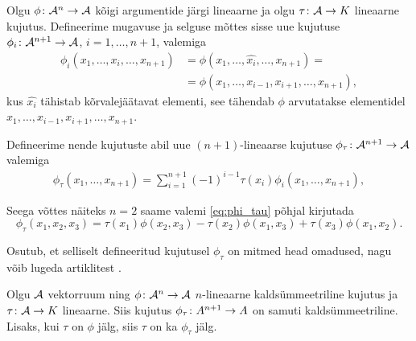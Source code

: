 Olgu $\phi \colon \mathcal{A}^n \to \mathcal{A}$ kõigi argumentide järgi lineaarne ja
olgu $\tau \colon \mathcal{A} \to K$ lineaarne kujutus. Defineerime mugavuse
ja selguse mõttes sisse uue kujutuse $\phi_i \colon \mathcal{A}^{n+1} \to \mathcal{A}$,
$i = 1, \dots, n+1$, valemiga
\begin{align*}
    \phi_i\left(x_1, \dots, x_i, \dots, x_{n+1}\right) &=
    \phi \left(x_1, \dots, \hat{x_i}, \dots, x_{n+1}\right) = \\
    &= \phi \left(x_1, \dots, x_{i-1}, x_{i+1}, \dots, x_{n+1}\right),
\end{align*}
kus $\hat{x_i}$ tähistab kõrvalejäätavat elementi, see tähendab
$\phi$ arvutatakse elementidel $x_1, \dots, x_{i-1}, x_{i+1}, \dots, x_{n+1}$.

Defineerime nende
kujutuste abil uue $(n+1)$-lineaarse kujutuse
$\phi_\tau \colon \mathcal{A}^{n+1} \to \mathcal{A}$ valemiga
\begin{align}\label{eq:phi_tau}
    \phi_\tau \left( x_1, \dots, x_{n+1} \right) =
    \sum_{i=1}^{n+1} (-1)^{i-1} \tau(x_i)
        \phi_i(x_1, \dots, x_{n+1}),
\end{align}


Seega võttes näiteks $n = 2$ saame valemi \eqref{eq:phi_tau}
põhjal kirjutada
\[
    \phi_\tau (x_1, x_2, x_3) =
        \tau(x_1) \phi(x_2, x_3) -
        \tau(x_2) \phi(x_1, x_3) +
        \tau(x_3) \phi(x_1, x_2).
\]

Osutub, et selliselt defineeritud kujutusel $\phi_\tau$ on
mitmed head omadused, nagu võib lugeda artiklitest \cite{AKMS:2014,AMS:2011}.

\begin{lemma}
    Olgu $\mathcal{A}$ vektorruum ning $\phi \colon \mathcal{A}^n \to \mathcal{A}$ $n$-lineaarne
    kaldsümmeetriline kujutus ja $\tau \colon \mathcal{A} \to K$ lineaarne.
    Siis kujutus $\phi_\tau \colon A^{n+1} \to A$ on samuti
    kaldsümmeetriline. Lisaks, kui $\tau$ on $\phi$ jälg, siis
    $\tau$ on ka $\phi_\tau$ jälg.
\end{lemma}

